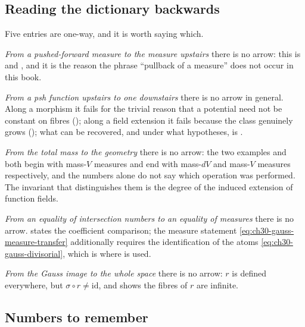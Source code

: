 \subsection{Reading the dictionary backwards}
\label{sec:ch30-dict-backward}

Five entries are one-way, and it is worth saying which.

\emph{From a pushed-forward measure to the measure upstairs} there is no
arrow: this is  and
, and it is the reason the phrase ``pullback of
a measure'' does not occur in this book.

\emph{From a psh function upstairs to one downstairs} there is no arrow in
general.  Along a morphism it fails for the trivial reason that a potential
need not be constant on fibres
(); along a field extension it fails
because the class genuinely grows
(); what can be recovered, and under what
hypotheses, is .

\emph{From the total mass to the geometry} there is no arrow: the two
examples  and
 both begin with mass-\(V\) measures and
end with mass-\(dV\) and mass-\(V\) measures respectively, and the numbers
alone do not say which operation was performed.  The invariant that
distinguishes them is the degree of the induced extension of function
fields.

\emph{From an equality of intersection numbers to an equality of measures}
there is no arrow.   states the
coefficient comparison; the measure statement
\eqref{eq:ch30-gauss-measure-transfer} additionally requires the
identification of the atoms
\eqref{eq:ch30-gauss-divisorial}, which is where
 is used.

\emph{From the Gauss image to the whole space} there is no arrow: \(r\) is
defined everywhere, but \(\sigma\circ r\neq\mathrm{id}\), and
 shows the fibres of \(r\) are infinite.

\subsection{Numbers to remember}
\label{sec:ch30-dict-numbers}

